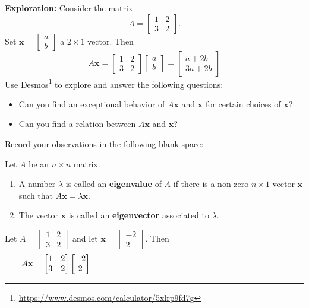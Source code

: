 \documentclass[20pt,a4paper]{extarticle}
\newcounter{example}
\newcounter{definition}
\begin{document}
\textbf{Exploration:} Consider the matrix
	\[
		A = \begin{bmatrix} 
		1 & 2 \\ 3 & 2
		\end{bmatrix} .
	\]
Set $\mathbf{x} = \begin{bmatrix} a \\ b \end{bmatrix}$ a $2 \times 1$ vector. Then
	\[
		A \mathbf{x} = \begin{bmatrix} 1 & 2 \\ 3 & 2 \end{bmatrix} \begin{bmatrix} a \\ b \end{bmatrix} = \begin{bmatrix} a + 2b \\ 3a + 2b \end{bmatrix} 
	\]
Use Desmos\footnote{\url{https://www.desmos.com/calculator/5xlrp9fd7g}} to explore and answer the following questions:
	\begin{itemize}
		\item Can you find an exceptional behavior of $A \mathbf{x}$ and $\mathbf{x}$ for certain choices of $\mathbf{x}$?
		\item Can you find a relation between $A \mathbf{x}$ and $\mathbf{x}$?
	\end{itemize}
Record your observations in the following blank space:

\newpage 

\begin{definition}
Let $A$ be an $n \times n$ matrix.
	\begin{enumerate}[label=\alph*)]
		\item A number $\lambda$ is called an \textbf{eigenvalue} of $A$ if there is a non-zero $n \times 1$ vector $\mathbf{x}$ such that $A \mathbf{x} = \lambda \mathbf{x}$.
		\item The vector $\mathbf{x}$ is called an \textbf{eigenvector} associated to $\lambda$. 
	\end{enumerate}
\end{definition}

\begin{example}
Let $A = \begin{bmatrix}  1 & 2 \\ 3 & 2  \end{bmatrix}$ and let $\mathbf{x} = \begin{bmatrix} -2 \\ 2 \end{bmatrix}$. Then
	\[
		A \mathbf{x} = \begin{bmatrix}  1 & 2 \\ 3 & 2 \end{bmatrix} \begin{bmatrix} -2 \\ 2 \end{bmatrix} = \hspace*{8cm}
	\]
\end{example}
\end{document}
